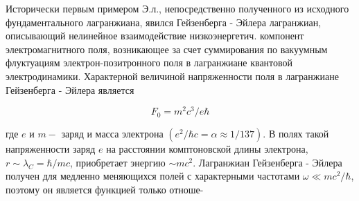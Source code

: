 \documentclass[10pt]{article}
\begin{document}
Исторически первым примером Э.л., непосредственно полученного из исходного фундаментального лагранжиана, явился Гейзенберга - Эйлера лагранжиан, описывающий нелинейное взаимодействие низкоэнергетич. компонент электромагнитного поля, возникающее за счет суммирования по вакуумным флуктуациям электрон-позитронного поля в лагранжиане квантовой электродинамики. Характерной величиной напряженности поля в лагранжиане Гейзенберга - Эйлера является



\[

F_{0}=m^{2} c^{3} / e \hbar

\]



где $e$ и $m-$ заряд и масса электрона $\left(e^{2} / \hbar c=\alpha \approx 1 / 137\right)$. В полях такой напряженности заряд $e$ на расстоянии комптоновской длины электрона, $r \sim \lambda_{C}=\hbar / m c$, приобретает энергию $\sim m c^{2}$. Лагранжиан Гейзенберга - Эйлера получен для медленно меняющихся полей с характерными частотами $\omega \ll m c^{2} / \hbar$, поэтому он является функцией только отноше-
\end{document}
